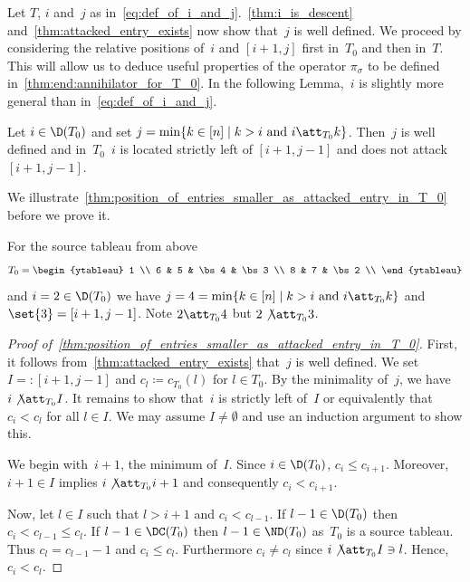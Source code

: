 Let $T$, $i$ and~$j$ as in~\eqref{eq:def_of_i_and_j}.~\cref{thm:i_is_descent} and~\cref{thm:attacked_entry_exists} now show that~$j$ is well defined. We proceed by considering the relative positions of~$i$ and $[i+1,j]$ first in~$T_0$ and then in~$T$. This will allow us to deduce useful properties of the operator $\pi_\sigma$ to be defined in~\cref{thm:end:annihilator_for_T_0}. In the following Lemma,~$i$ is slightly more general than in~\eqref{eq:def_of_i_and_j}.

\begin{lemma}
	\label{thm:position_of_entries_smaller_as_attacked_entry_in_T_0}
	Let $i\in \D(T_0)$ and set $j = \min \{k \in [n] \mid k>i \text{ and } i\att_{T_0} k \}$.
	Then~$j$ is well defined and in~$T_0$~$i$ is located strictly left of $[i+1,j-1]$ and does not attack $[i+1,j-1]$.
\end{lemma}

We illustrate~\cref{thm:position_of_entries_smaller_as_attacked_entry_in_T_0} before we prove it.

	\begin{exam} For the source tableau from above
		\[
			T_0
			= 
\begin{ytableau} 
1 \\ 
6 & 5 & \bs4 & \bs3 \\ 
8 & 7 & \bs2 \\ 
\end{ytableau} 
		\]
		and $i=2\in \D(T_0)$ we have $j = 4 =\min \{k \in [n] \mid k>i \text{ and } i\att_{T_0} k \}$ and $\set{3} = [i+1,j-1]$. Note $2\att_{T_0} 4$ but $2\not \att_{T_0} 3$.
	\end{exam}

	\begin{proof}[Proof of~\cref{thm:position_of_entries_smaller_as_attacked_entry_in_T_0}]
		First, it follows from~\cref{thm:attacked_entry_exists} that~$j$ is well defined. 
		We set $I =: [i+1,j-1]$ and $c_l \coloneqq c_{T_0}(l)$ for $l \in T_0$.
		By the minimality of~$j$, we have $i\not \att_{T_0} I$.
		It remains to show that~$i$ is strictly left of~$I$ or equivalently that $c_i < c_l$ for all $l\in I$.
		We may assume $I\neq \emptyset$ and use an induction argument to show this.
		
		We begin with~$i+1$, the minimum of~$I$.
		 Since $i\in \D(T_0)$, $c_i \leq c_{i+1}$. Moreover, $i+1\in I$ implies $i\not \att_{T_0} i+1$ and consequently $c_i < c_{i+1}$.
		
		Now, let $l\in I$ such that $l>i+1$ and $c_i < c_{l-1}$.
		If $l-1\in \D(T_0)$ then $c_i < c_{l-1} \leq c_l$.
		If $l-1\in \DC(T_0)$ then $l-1\in \ND(T_0)$ as~$T_0$ is a source tableau.
		Thus $c_l= c_{l-1}-1$ and $c_i \leq c_l$. Furthermore $c_i \neq c_l$ since $i\not \att_{T_0} I \ni l$.
		Hence, $c_i< c_l$.
			 \qedhere
	\end{proof}

